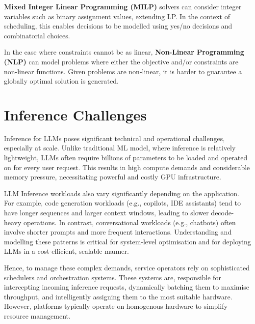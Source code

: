 \textbf{Mixed Integer Linear Programming (MILP)} solvers can consider integer variables such as binary assignment values, extending LP.
In the context of scheduling, this enables decisions to be modelled using yes/no decisions and combinatorial choices.

In the case where constraints cannot be as linear, \textbf{Non-Linear Programming (NLP)} can model problems where either the objective and/or constraints are non-linear functions.
Given problems are non-linear, it is harder to guarantee a globally optimal solution is generated.

%
%

\section{Inference Challenges}
\label{chap:inference-challanges}

Inference for LLMs poses significant technical and operational challenges, especially at scale.
Unlike traditional ML model, where inference is relatively lightweight, LLMs often require billions of parameters to be loaded and operated on for every user request.
This results in high compute demands and considerable memory pressure, necessitating powerful and costly GPU infrastructure. %

LLM Inference workloads also vary significantly depending on the application.
For example, code generation workloads (e.g., copilots, IDE assistants) tend to have longer sequences and larger context windows, leading to slower decode-heavy operations.
In contrast, conversational workloads (e.g., chatbots) often involve shorter prompts and more frequent interactions.
Understanding and modelling these patterns is critical for system-level optimisation and for deploying LLMs in a cost-efficient, scalable manner. %

Hence, to manage these complex demands, service operators rely on sophisticated schedulers and orchestration systems. %
These systems are, responsible for intercepting incoming inference requests, dynamically batching them to maximise throughput, and intelligently assigning them to the most suitable hardware.
However, platforms typically operate on homogenous hardware to simplify resource management. %
